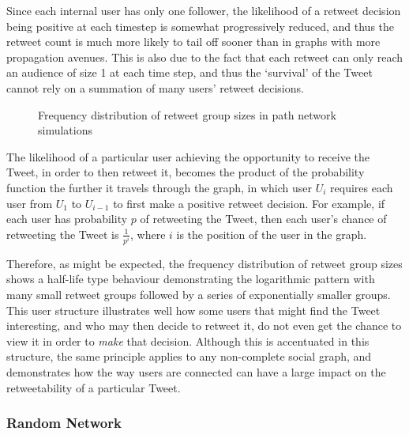 Since each internal user has only one follower, the likelihood of a retweet decision being positive at each timestep is somewhat progressively reduced, and thus the retweet count is much more likely to tail off sooner than in graphs with more propagation avenues. This is also due to the fact that each retweet can only reach an audience of size 1 at each time step, and thus the `survival' of the Tweet cannot rely on a summation of many users' retweet decisions. 

\begin{figure}[h]
\centering
{}
\caption{Frequency distribution of retweet group sizes in path network simulations}
\label{fig:linear}
\end{figure}

The likelihood of a particular user achieving the opportunity to receive the Tweet, in order to then retweet it, becomes the product of the probability function the further it travels through the graph, in which user $U_i$ requires each user from $ U_1$ to $U_{i-1}$ to first make a positive retweet decision. For example, if each user has probability $p$ of retweeting the Tweet, then each user's chance of retweeting the Tweet is $\frac{1}{p^i}$, where $i$ is the position of the user in the graph.

Therefore, as might be expected, the frequency distribution of retweet group sizes shows a half-life type behaviour demonstrating the logarithmic pattern with many small retweet groups followed by a series of exponentially smaller groups. This user structure illustrates well how some users that might find the Tweet interesting, and who may then decide to retweet it, do not even get the chance to view it in order to \textit{make} that decision. Although this is accentuated in this structure, the same principle applies to any non-complete social graph, and demonstrates how the way users are connected can have a large impact on the retweetability of a particular Tweet.


\subsubsection{Random Network}

